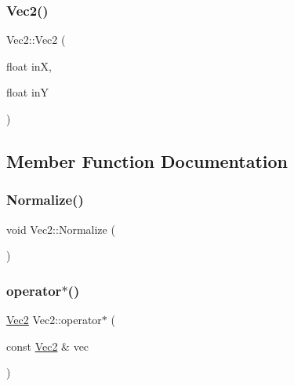 \mbox{\label{struct_vec2_a2c1181bd206d6544bf8487cf688a7096}} 
\subsubsection{\texorpdfstring{Vec2()}{Vec2()}\hspace{0.1cm}{\footnotesize\ttfamily [2/2]}}
{\footnotesize\ttfamily Vec2\+::\+Vec2 (\begin{DoxyParamCaption}\item[{float}]{inX,  }\item[{float}]{inY }\end{DoxyParamCaption})}



\subsection{Member Function Documentation}
\mbox{\label{struct_vec2_a0ccdf7c1f30b7e2e368860ed8530a296}} 
\subsubsection{\texorpdfstring{Normalize()}{Normalize()}}
{\footnotesize\ttfamily void Vec2\+::\+Normalize (\begin{DoxyParamCaption}{ }\end{DoxyParamCaption})}

\mbox{\label{struct_vec2_a99d3335f38f28886070edacf65b45e5d}} 
\subsubsection{\texorpdfstring{operator$\ast$()}{operator*()}\hspace{0.1cm}{\footnotesize\ttfamily [1/2]}}
{\footnotesize\ttfamily \mbox{\hyperlink{struct_vec2}{Vec2}} Vec2\+::operator$\ast$ (\begin{DoxyParamCaption}\item[{const \mbox{\hyperlink{struct_vec2}{Vec2}} \&}]{vec }\end{DoxyParamCaption})}

\mbox{\label{struct_vec2_a9dfc7d928d6f12e90067538e7ac20903}} 
